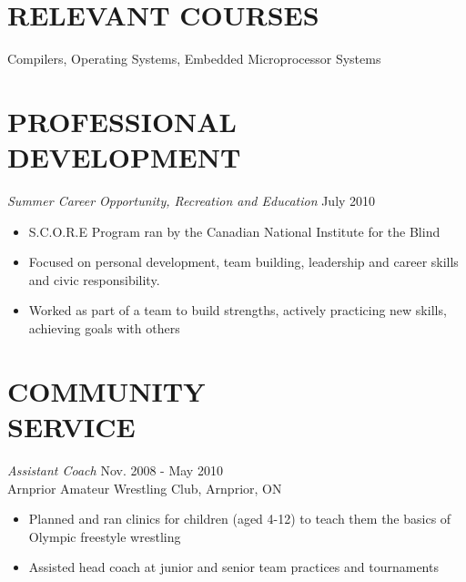\documentclass[margin]{res}
\begin{document}
\begin{resume}


\section{RELEVANT COURSES}
Compilers, Operating Systems, Embedded Microprocessor Systems

\section{PROFESSIONAL DEVELOPMENT} {\sl Summer Career Opportunity, Recreation and Education} \hfill July 2010
\begin{itemize} \itemsep -2pt
  \item S.C.O.R.E Program ran by the Canadian National Institute for the Blind
  \item Focused on personal development, team building, leadership and career skills and civic responsibility.
  \item Worked as part of a team to build strengths, actively practicing new skills, achieving goals with others
\end{itemize}

\section{COMMUNITY \\ SERVICE}  {\sl Assistant Coach} \hfill Nov. 2008 - May 2010\\
Arnprior Amateur Wrestling Club, Arnprior, ON
\begin{itemize}\itemsep -2pt
  \item Planned and ran clinics for children (aged 4-12) to teach them the basics of Olympic freestyle wrestling
  \item Assisted head coach at junior and senior team practices and tournaments
\end{itemize}


\end{resume}
\end{document}
